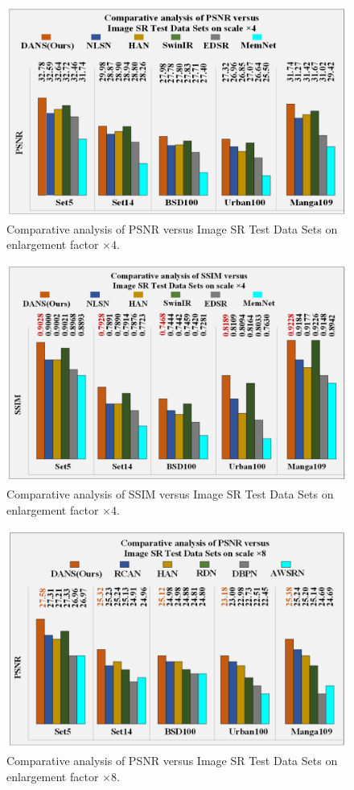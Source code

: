 \documentclass{ieeeaccess}
\begin{document}
\begin{figure}[ht]
  \includegraphics[width=\linewidth]{7FIGURE.pdf}
  \caption{Comparative analysis of PSNR versus Image SR Test Data Sets on enlargement factor $\times4$.}
  \label{fig:7}
\end{figure}

\begin{figure}[ht]
  \includegraphics[width=\linewidth]{8FIGURE.pdf}
  \caption{Comparative analysis of SSIM versus Image SR Test Data Sets on enlargement factor $\times4$.}
  \label{fig:8}
\end{figure}

\begin{figure}[ht]
  \includegraphics[width=\linewidth]{9FIGURE.pdf}
  \caption{Comparative analysis of PSNR versus Image SR Test Data Sets on enlargement factor $\times8$.}
  \label{fig:9}
\end{figure}
\end{document}
